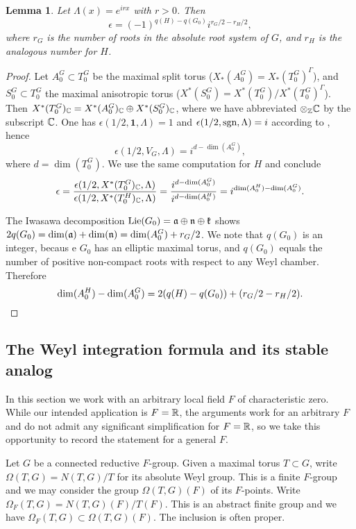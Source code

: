 \documentclass{article}
\newtheorem{lem}[thm]{Lemma}
\theoremstyle{definition}
\numberwithin{equation}{section}
\renewcommand{\-}{\hyp{}}
\begin{document}
\begin{lem} \label{lem:epsilon}
Let $\Lambda(x)=e^{irx}$ with $r>0$. Then
\[ \epsilon = (-1)^{q(H)-q(G_0)}i^{r_G/2-r_H/2}, \]
where $r_G$ is the number of roots in the absolute root system of $G$, and $r_H$ is the analogous number for $H$.
\end{lem}
\begin{proof}
Let $A_0^G \subset T_0^G$ be the maximal split torus ($X_*(A_0^G)=X_*(T_0^G)^\Gamma$), and $S_0^G \subset T_0^G$ the maximal anisotropic torus ($X^*(S_0^G)=X^*(T_0^G)/X^*(T_0^G)^\Gamma$). Then $X^*(T_0^G)_{\mathbb{C}}=X^*(A_0^G)_{\mathbb{C}} \oplus X^*(S_0^G)_{\mathbb{C}}$, where we have abbreviated $\otimes_{\mathbb{Z}}\mathbb{C}$ by the subscript $\mathbb{C}$. One has $\epsilon(1/2,\textbf{1},\Lambda)=1$ and $\epsilon(1/2,\textrm{sgn},\Lambda)=i$ according to \cite[(3.2.4)]{TateCor}, hence
\[ \epsilon(1/2,V_G,\Lambda)=i^{d-\dim(A_0^G)}, \]
where $d=\dim(T_0^G)$. We use the same computation for $H$ and conclude
\[ \epsilon=\frac{\epsilon(1/2,X^*(T_0^G)_{\mathbb{C}},\Lambda)}{\epsilon(1/2,X^*(T_0^H)_{\mathbb{C}},\Lambda)} = \frac{i^{d-\dim(A_0^G)}}{i^{d-\dim(A_0^H)}}=i^{\dim(A_0^H)-\dim(A_0^G)}. \]

The Iwasawa decomposition $\textrm{Lie}(G_0)=\mathfrak{a} \oplus\mathfrak{n} \oplus \mathfrak{k}$ shows  $2q(G_0)=\dim(\mathfrak{a})+\dim(\mathfrak{n})=\dim(A_0^G)+r_G/2$. We note that $q(G_0)$ is an integer, becaus e $G_0$ has an elliptic maximal torus, and $q(G_0)$ equals the number of positive non-compact roots with respect to any Weyl chamber. Therefore
\[ \dim(A_0^H)-\dim(A_0^G) = 2(q(H)-q(G_0))+(r_G/2-r_H/2).\qedhere \]
\end{proof}


\subsection{The Weyl integration formula and its stable analog} 

In this section we work with an arbitrary local field $F$ of characteristic zero. While our intended application is $F=\mathbb{R}$, the arguments work for an arbitrary $F$ and do not admit any significant simplification for $F=\mathbb{R}$, so we take this opportunity to record the statement for a general $F$. 

Let $G$ be a connected reductive $F$-group. Given a maximal torus $T \subset G$, write $\Omega(T,G)=N(T,G)/T$ for its absolute Weyl group. This is a finite $F$-group and we may consider the group $\Omega(T,G)(F)$ of its $F$-points. Write $\Omega_F(T,G)=N(T,G)(F)/T(F)$. This is an abstract finite group and we have $\Omega_F(T,G) \subset \Omega(T,G)(F)$. The inclusion is often proper.
\end{document}
